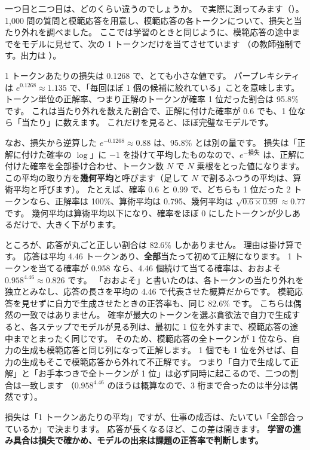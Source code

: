 一つ目と二つ目は、どのくらい違うのでしょうか。
 で実際に測ってみます（）。
1,000 問の質問と模範応答を用意し、模範応答の各トークンについて、損失と当たり外れを調べました。
ここでは学習のときと同じように、模範応答の途中までをモデルに見せて、次の 1 トークンだけを当てさせています
（の教師強制です。出力は ）。

1 トークンあたりの損失は 0.1268 で、とても小さな値です。
パープレキシティは $e^{0.1268}\approx1.135$ で、「毎回ほぼ 1 個の候補に絞れている」ことを意味します。
トークン単位の正解率、つまり正解のトークンが確率 1 位だった割合は 95.8\% です。
これは当たり外れを数えた割合で、正解に付けた確率が 0.6 でも、1 位なら「当たり」に数えます。
これだけを見ると、ほぼ完璧なモデルです。

なお、損失から逆算した $e^{-0.1268}\approx0.88$ は、95.8\% とは別の量です。
損失は「正解に付けた確率の $\log$」に $-1$ を掛けて平均したものなので、$e^{-\text{損失}}$ は、正解に付けた確率を全部掛け合わせ、トークン数 $N$ で $N$ 乗根をとった値になります。
この平均の取り方を\textbf{幾何平均}と呼びます（足して $N$ で割るふつうの平均は、算術平均と呼びます）。
たとえば、確率 0.6 と 0.99 で、どちらも 1 位だった 2 トークンなら、正解率は 100\%、算術平均は 0.795、幾何平均は $\sqrt{0.6\times0.99}\approx0.77$ です。
幾何平均は算術平均以下になり、確率をほぼ 0 にしたトークンが少しあるだけで、大きく下がります。

ところが、応答が丸ごと正しい割合は 82.6\% しかありません。
理由は掛け算です。
応答は平均 4.46 トークンあり、\textbf{全部}当たって初めて正解になります。
1 トークンを当てる確率が 0.958 なら、4.46 個続けて当てる確率は、おおよそ $0.958^{4.46}\approx0.826$ です。
「おおよそ」と書いたのは、各トークンの当たり外れを独立とみなし、応答の長さを平均の 4.46 で代表させた概算だからです。
模範応答を見せずに自力で生成させたときの正答率も、同じ 82.6\% です。
こちらは偶然の一致ではありません。
確率が最大のトークンを選ぶ貪欲法で自力で生成すると、各ステップでモデルが見る列は、最初に 1 位を外すまで、模範応答の途中までとまったく同じです。
そのため、模範応答の全トークンが 1 位なら、自力の生成も模範応答と同じ列になって正解します。
1 個でも 1 位を外せば、自力の生成もそこで模範応答から外れて不正解です。
つまり「自力で生成して正解」と「お手本つきで全トークンが 1 位」は必ず同時に起こるので、二つの割合は一致します
（$0.958^{4.46}$ のほうは概算なので、3 桁まで合ったのは半分は偶然です）。

損失は「1 トークンあたりの平均」ですが、仕事の成否は、たいてい「全部合っているか」で決まります。
応答が長くなるほど、この差は開きます。
\textbf{学習の進み具合は損失で確かめ、モデルの出来は課題の正答率で判断します。}

